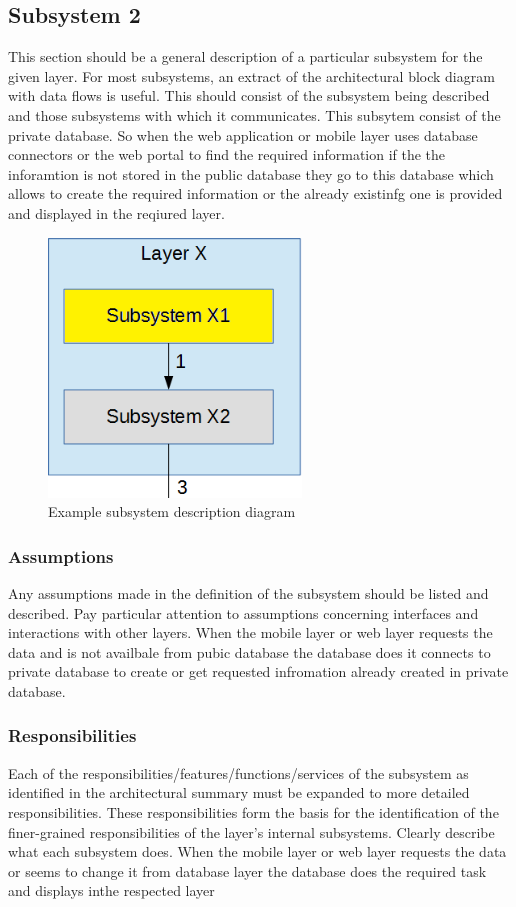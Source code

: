 \subsection{Subsystem 2}
This section should be a general description of a particular subsystem for the given layer. For most subsystems, an extract of the architectural block diagram with data flows is useful. This should consist of the subsystem being described and those subsystems with which it communicates.
This subsytem consist of the private database. So when the web application or mobile layer uses database connectors or the web portal to find the required information if the the inforamtion is not stored in the public database they go to this database which allows to create the required information or the already existinfg one is provided and displayed in the reqiured layer.
\begin{figure}[h!]
	\centering
 	\includegraphics[width=0.60\textwidth]{images/subsystem}
 \caption{Example subsystem description diagram}
\end{figure}

\subsubsection{Assumptions}
Any assumptions made in the definition of the subsystem should be listed and described. Pay particular attention to assumptions concerning interfaces and interactions with other layers.
When the mobile layer or web layer requests the data and is not availbale from pubic database the database does it connects to private database to create or get requested infromation already created in private database.

\subsubsection{Responsibilities}
Each of the responsibilities/features/functions/services of the subsystem as identified in the architectural summary must be expanded to more detailed responsibilities. These responsibilities form the basis for the identification of the finer-grained responsibilities of the layer's internal subsystems. Clearly describe what each subsystem does.
When the mobile layer or web layer requests the data or seems to change it from database layer the database does the required task and displays inthe respected layer
